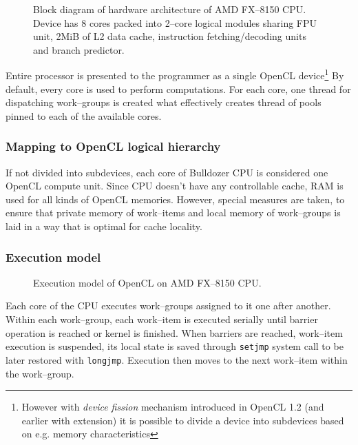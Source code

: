 \begin{figure}[htb]
  \begin{center}
    \scalebox{0.9} {
      
    }
  \end{center}
  \caption{Block diagram of hardware architecture of AMD FX--8150 CPU. Device
    has 8 cores packed into 2--core logical modules sharing FPU unit, 2MiB of
    L2 data cache, instruction fetching/decoding units and branch predictor.}
  \label{fig:bulldozerarch}
\end{figure}

Entire processor is presented to the programmer as a single OpenCL
device\footnote{However with \emph{device fission} mechanism introduced in OpenCL 1.2 (and
earlier with extension) it is possible to divide a device into subdevices based on e.g. memory characteristics}
By default, every core is used to perform computations. For each core, one
thread for dispatching work--groups is created what effectively creates thread
of pools pinned to each of the available cores.

\subsubsection{Mapping to OpenCL logical hierarchy}
If not divided into subdevices, each core of Bulldozer CPU is considered one
OpenCL compute unit. Since CPU doesn't have any controllable cache, RAM is used
for all kinds of OpenCL memories. However, special measures are taken, to ensure
that private memory of work--items and local memory of work--groups is
laid in a way that is optimal for cache locality.
\subsubsection{Execution model}
\begin{figure}[htb]
  \begin{center}
    
  \end{center}
  \caption{Execution model of OpenCL on AMD FX--8150 CPU.}
  \label{fig:clbullexec}
\end{figure}

Each core of the CPU executes work--groups assigned to it one after another.
Within each work--group, each work--item is executed serially until barrier
operation is reached or kernel is finished. When barriers are reached,
work--item execution is suspended, its local state is saved through
\texttt{setjmp} system call to be later restored with \texttt{longjmp}.
Execution then moves to the next work--item within the work--group.

